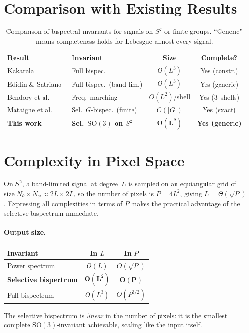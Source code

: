 \documentclass{article}
\theoremstyle{plain}
\theoremstyle{definition}
\theoremstyle{remark}
\newcommand{\SO}{\mathrm{SO}}
\begin{document}
\section{Comparison with Existing Results}\label{sec:comparison}

\begin{table}[t]
  \caption{Comparison of bispectral invariants for signals on $S^2$ or
    finite groups. ``Generic'' means completeness holds for
    Lebesgue-almost-every signal.}
  \label{tab:comparison}
  \centering
  \small
  \setlength{\tabcolsep}{4pt}
  \begin{tabular}{@{}l l c c@{}}
    \toprule
    Result & Invariant & Size & Complete? \\
    \midrule
    Kakarala~\cite{kakarala2009}
      & Full bispec. & $O(L^3)$ & Yes (constr.) \\
    Edidin \& Satriano~\cite{edidin2023}
      & Full bispec.\ (band-lim.)
      & $O(L^3)$ & Yes (generic) \\
    Bendory et al.~\cite{bendory2025}
      & Freq.\ marching
      & $O(L^2)$/shell & Yes (3~shells) \\
    Mataigne et al.~\cite{mataigne2024}
      & Sel.\ $G$-bispec.\ (finite)
      & $O(|G|)$ & Yes (exact) \\
    \textbf{This work}
      & \textbf{Sel.\ $\SO(3)$ on $S^2$}
      & $\boldsymbol{O(L^2)}$ & \textbf{Yes (generic)} \\
    \bottomrule
  \end{tabular}
\end{table}


\section{Complexity in Pixel Space}\label{sec:pixel-complexity}

On $S^2$, a band-limited signal at degree~$L$ is sampled on an
equiangular grid of size $N_\theta \times N_\varphi \approx 2L \times 2L$,
so the number of pixels is $P = 4L^2$, giving $L = \Theta(\sqrt{P})$.
Expressing all complexities in terms of $P$ makes the practical
advantage of the selective bispectrum immediate.

\paragraph{Output size.}
\begin{center}
\small
\begin{tabular}{lcc}
  \toprule
  Invariant & In $L$ & In $P$ \\
  \midrule
  Power spectrum & $O(L)$ & $O(\sqrt{P})$ \\
  \textbf{Selective bispectrum} & $\boldsymbol{O(L^2)}$
    & $\boldsymbol{O(P)}$ \\
  Full bispectrum & $O(L^3)$ & $O(P^{3/2})$ \\
  \bottomrule
\end{tabular}
\end{center}
The selective bispectrum is \emph{linear} in the number of pixels: it
is the smallest complete $\SO(3)$-invariant achievable, scaling like
the input itself.
\end{document}
